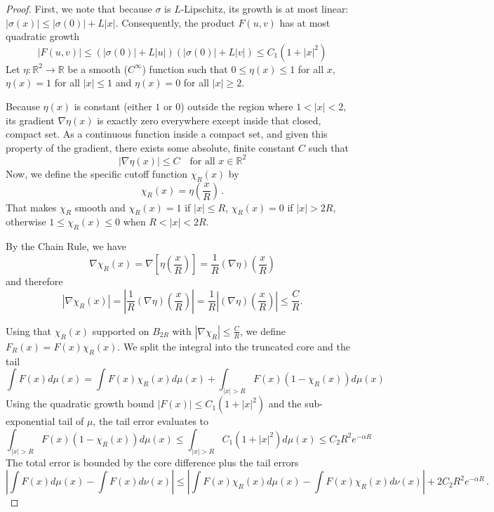 \begin{proof}
    First, we note that because $\sigma$ is $L$-Lipschitz, its growth is at most linear: $|\sigma(x)| \le |\sigma(0)| + L|x|$. Consequently, the product $F(u,v)$ has at most quadratic growth
    \[
        |F(u,v)| \le (|\sigma(0)| + L|u|)(|\sigma(0)| + L|v|) \le C_1(1 + |x|^2)
    \]
    Let $\eta: \mathbb{R}^2 \to \mathbb{R}$ be a smooth ($C^\infty$) function such that $0 \le \eta(x) \le 1$ for all $x$, $\eta(x) = 1$ for all $|x| \le 1$ and $\eta(x) = 0$ for all $|x| \ge 2$.
    
    Because $\eta(x)$ is constant (either $1$ or $0$) outside the region where $1 < |x| < 2$, its gradient $\nabla \eta(x)$ is exactly zero everywhere except inside that closed, compact set. As a continuous function inside a compact set, and given this property of the gradient, there exists some absolute, finite constant $C$ such that
    \[
        |\nabla \eta(x)| \le C \quad \text{for all } x \in \mathbb{R}^2
    \]
    Now, we define the specific cutoff function $\chi_R(x)$ by
    \[
        \chi_R(x) = \eta\left(\frac{x}{R}\right)\, .
    \]
    That makes $\chi_R$ smooth and $\chi_R(x) = 1$ if $|x|\leq R$, $\chi_R(x) = 0$ if $|x| > 2R$, otherwise $1 \leq \chi_R(x) \leq 0$ when $R < |x| < 2R$.
    
    By the Chain Rule, we have
    \[
        \nabla \chi_R(x) = \nabla \left[ \eta\left(\frac{x}{R}\right) \right] = \frac{1}{R} (\nabla \eta)\left(\frac{x}{R}\right)
    \]
    and therefore 
    \[
        |\nabla \chi_R(x)| = \left| \frac{1}{R} (\nabla \eta)\left(\frac{x}{R}\right) \right| = \frac{1}{R} \left| (\nabla \eta)\left(\frac{x}{R}\right) \right| \leq \frac{C}{R}.
    \]
    
    Using that $\chi_R(x)$ supported on $B_{2R}$ with $|\nabla \chi_R| \le \frac{C}{R}$, we define $F_R(x) = F(x)\chi_R(x)$. We split the integral into the truncated core and the tail
    \[
        \int F(x) d\mu(x) = \int F(x) \chi_R(x) d\mu(x) + \int_{|x| > R} F(x)(1 - \chi_R(x)) d\mu(x)
    \]
    Using the quadratic growth bound $|F(x)| \le C_1(1 + |x|^2)$ and the sub-exponential tail of $\mu$, the tail error evaluates to
    \[
        \int_{|x| > R} F(x)(1 - \chi_R(x)) d\mu(x)\le \int_{|x|>R} C_1(1 + |x|^2) d\mu(x) \le C_2 R^2 e^{-\alpha R}
    \]
    The total error is bounded by the core difference plus the tail errors
    \[
        \left| \int F(x) d\mu(x) - \int F(x) d\nu(x) \right| \le \left| \int F(x)\chi_R(x) d\mu(x) - \int F(x)\chi_R(x) d\nu(x) \right| + 2C_2 R^2 e^{-\alpha R}\, .
    \]
    

\end{proof}
